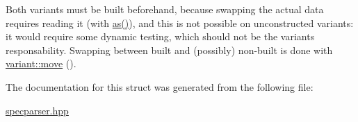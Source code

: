 Both variants must be built beforehand, because swapping the actual data requires reading it (with \hyperlink{structyy_1_1variant_a7fae4866c8d57a6f2ea30e9926e367cd}{as()}), and this is not possible on unconstructed variants\+: it would require some dynamic testing, which should not be the variant\textquotesingle{}s responsability. Swapping between built and (possibly) non-\/built is done with \hyperlink{structyy_1_1variant_ae71b4ef21f1446b328b9d93dbc6806e1}{variant\+::move} (). 

The documentation for this struct was generated from the following file\+:\begin{DoxyCompactItemize}
\item 
\hyperlink{specparser_8hpp}{specparser.\+hpp}\end{DoxyCompactItemize}
